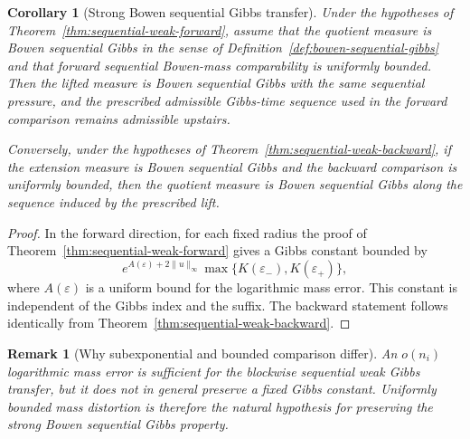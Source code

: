 \documentclass[11pt,a4paper]{article}
\newtheorem{corollary}[theorem]{Corollary}
\newtheorem{remark}[theorem]{Remark}
\newcommand{\eps}{\varepsilon}
\begin{document}
\begin{corollary}[Strong Bowen sequential Gibbs transfer]
\label{cor:sequential-gibbs-transfer}
Under the hypotheses of Theorem~\ref{thm:sequential-weak-forward}, assume
that the quotient measure is Bowen sequential Gibbs in the sense of
Definition~\ref{def:bowen-sequential-gibbs} and that forward sequential
Bowen-mass comparability is uniformly bounded. Then the lifted measure is
Bowen sequential Gibbs with the same sequential pressure, and the prescribed
admissible Gibbs-time sequence used in the forward comparison remains
admissible upstairs.

Conversely, under the hypotheses of Theorem~\ref{thm:sequential-weak-backward},
if the extension measure is Bowen sequential Gibbs and the backward
comparison is uniformly bounded, then the quotient measure is Bowen
sequential Gibbs along the sequence induced by the prescribed lift.
\end{corollary}

\begin{proof}
In the forward direction, for each fixed radius the proof of
Theorem~\ref{thm:sequential-weak-forward} gives a Gibbs constant bounded by
\[
 e^{A(\eps)+2\|u\|_\infty}
 \max\{K(\eps_-),K(\eps_+)\},
\]
where $A(\eps)$ is a uniform bound for the logarithmic mass error. This
constant is independent of the Gibbs index and the suffix. The backward
statement follows identically from
Theorem~\ref{thm:sequential-weak-backward}.
\end{proof}

\begin{remark}[Why subexponential and bounded comparison differ]
An $o(n_i)$ logarithmic mass error is sufficient for the blockwise sequential
weak Gibbs transfer, but it does not in general preserve a fixed Gibbs
constant. Uniformly bounded mass distortion is therefore the natural
hypothesis for preserving the strong Bowen sequential Gibbs property.
\end{remark}
\end{document}
